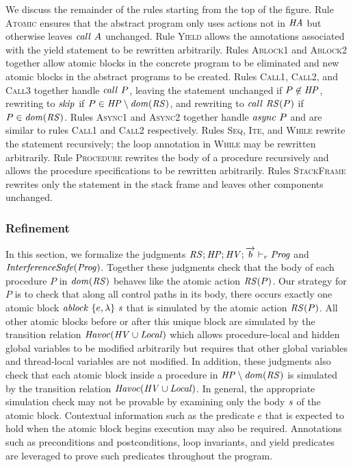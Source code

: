 We discuss the remainder of the rules starting from the top of the figure.
Rule \textsc{Atomic} ensures that the abstract program only uses actions not in $\mathit{HA}$ 
but otherwise leaves $\mathit{call}\ A$ unchanged.
Rule \textsc{Yield} allows the annotations associated with the yield statement to be rewritten arbitrarily.
Rules \textsc{Ablock1} and \textsc{Ablock2} together allow atomic blocks in the concrete program to be eliminated
and new atomic blocks in the abstract programs to be created.
Rules \textsc{Call1}, \textsc{Call2}, and \textsc{Call3} together handle $\mathit{call}\ P$,
leaving the statement unchanged if $P \not \in \mathit{HP}$, 
rewriting to $\mathit{skip}$ if $P \in \mathit{HP} \setminus \mathit{dom}(\mathit{RS})$,
and rewriting to $\mathit{call}\ \mathit{RS}(P)$ if $P \in \mathit{dom}(\mathit{RS})$.
Rules \textsc{Async1} and \textsc{Async2} together handle $\mathit{async}\ P$ and are similar 
to rules \textsc{Call1} and \textsc{Call2} respectively.
Rules \textsc{Seq}, \textsc{Ite}, and \textsc{While} rewrite the statement recursively;
the loop annotation in \textsc{While} may be rewritten arbitrarily.
Rule \textsc{Procedure} rewrites the body of a procedure recursively and allows the procedure
specifications to be rewritten arbitrarily.
Rules \textsc{StackFrame} rewrites only the statement in the stack frame and leaves other components unchanged.

\subsubsection{Refinement}
\label{sec:refinement}

In this section, we formalize the judgments $\mathit{RS};\mathit{HP};\mathit{HV};\overrightarrow{b} \vdash_r \mathit{Prog}$ and $\mathit{InterferenceSafe}(\mathit{Prog})$.
Together these judgments check that the body of each procedure $P$ in $\mathit{dom}(\mathit{RS})$ behaves like the atomic action $\mathit{RS}(P)$.
Our strategy for $P$ is to check that along all control paths in its body, there occurs exactly one atomic block 
$\mathit{ablock}\ {\{e,\lambda\}}\ {\mathit{s}}$ that is simulated by the atomic action $\mathit{RS}(P)$.
All other atomic blocks before or after this unique block are simulated by the transition relation $\mathit{Havoc}(\mathit{HV} \cup \mathit{Local})$ 
which allows procedure-local and hidden global variables to be modified arbitrarily but requires that other global variables and thread-local variables are not modified.
In addition, these judgments also check that each atomic block inside a procedure in $\mathit{HP} \setminus \mathit{dom}(\mathit{RS})$ 
is simulated by the transition relation $\mathit{Havoc}(\mathit{HV} \cup \mathit{Local})$.
In general, the appropriate simulation check may not be provable by examining only the body $\mathit{s}$ of the atomic block.
Contextual information such as the predicate $e$ that is expected to hold when the atomic block begins execution may also be required.
Annotations such as preconditions and postconditions, loop invariants, and yield predicates are leveraged to prove 
such predicates throughout the program.

